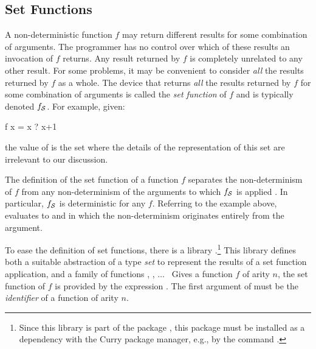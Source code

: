 \newcommand{\funset}[1]{#1\ensuremath{_{\cal S}}}
\subsection{Set Functions}
\label{Set Functions}

A non-deterministic function $f$ may return different results for
some combination of arguments.  The programmer has no control over
which of these results an invocation of $f$ returns.
Any result returned by $f$ is completely unrelated to any other result.
For some problems, it may be convenient to consider \emph{all}
the results returned by $f$ as a whole.
The device that returns \emph{all} the results returned by $f$
for some combination of arguments is called the \emph{set function} of $f$
and is typically denoted $\funset f$.
For example, given:
%
\begin{prog}
  f x = x ? x+1
\end{prog}
%
the value of \code{\funset{f} x} is the set 
where the details of the representation of this set are irrelevant to our
discussion.

The definition of the set function of a function $f$
separates the non-determinism of $f$ from any non-determinism
of the arguments to which $\funset{f}$ is applied \cite{AntoyHanus09PPDP}.
In particular, $\funset{f}$ is deterministic for any $f$.
Referring to the example above, \code{\funset{f} (2\,?\,4)} evaluates
to  and  in which the non-determinism
originates entirely from the argument.

To ease the definition of set functions,
there is a library
.\footnote{Since this library is
part of the package ,
this package must be installed as a dependency
with the Curry package manager, e.g., by the command
.}
This library defines both a suitable abstraction of a type \emph{set}
to represent the results of a set function application, and
a family of functions , , $\ldots$~
Gives a function $f$ of arity $n$,
the set function of $f$ is provided by the expression .
The first argument of  must be the \emph{identifier}
of a function of arity $n$.

